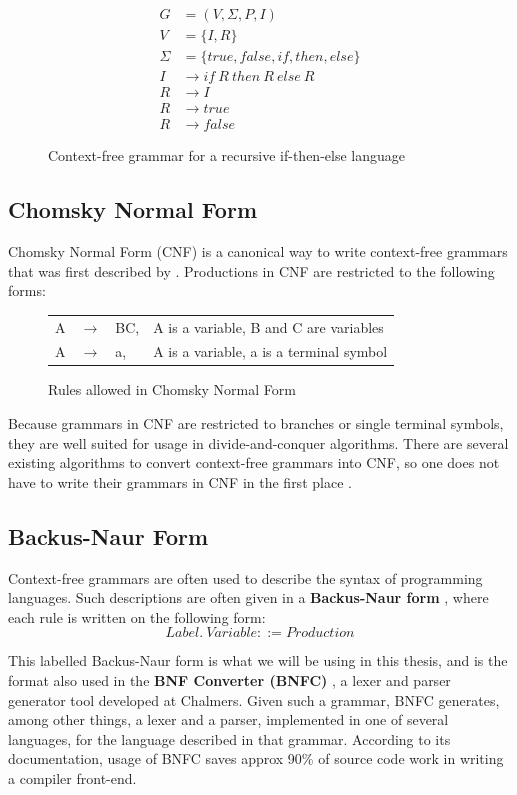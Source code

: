 \documentclass[a4paper,12pt,twosided]{report}
\renewcommand\cite{\citep}
\begin{document}
\begin{figure}[H]
\begin{align*}
G &= (V, \Sigma , P, I) \\
V &= \{I,R\} \\
\Sigma &= \{true,false,if,then,else\} \\
I &\rightarrow if\ R\ then\ R\ else\ R \\
R &\rightarrow I \\
R &\rightarrow true \\
R &\rightarrow false
\end{align*}
\caption{Context-free grammar for a recursive if-then-else language}
\label{iflang}
\end{figure}

\subsection{Chomsky Normal Form}
Chomsky Normal Form (CNF) is a canonical way to write context-free grammars that
was first described by \citet{synstruct}. Productions in CNF are restricted to
the following forms:

\begin{figure}[H]
\begin{tabular}{l l l l}
    A & $\rightarrow$ & BC, & A is a variable, B and C are variables \\
    A & $\rightarrow$ & a, & A is a variable, a is a terminal symbol \\
\end{tabular}
\caption{Rules allowed in Chomsky Normal Form}
\end{figure}
Because grammars in CNF are restricted to branches or single terminal symbols,
they are well suited for usage in divide-and-conquer algorithms. There are
several existing algorithms to convert context-free grammars into CNF, so one
does not have to write their grammars in CNF in the first place \cite{langeleiss}.

\subsection{Backus-Naur Form}
Context-free grammars are often used to describe the syntax of programming
languages. Such descriptions are often given in a \textbf{Backus-Naur form}
\cite{backusform}, where each rule is written on the following form:
\[
Label.\ Variable ::= Production 
\]

This labelled Backus-Naur form is what we will be using in this thesis, and is
the format also used in the \textbf{BNF Converter (BNFC)} \cite{bnfc}, a lexer
and parser generator tool developed at Chalmers.  Given such a grammar, BNFC
generates, among other things, a lexer and a parser, implemented in one of
several languages, for the language described in that grammar. According to its
documentation, usage of BNFC saves approx 90\% of source code work in writing a
compiler front-end. 
\end{document}

